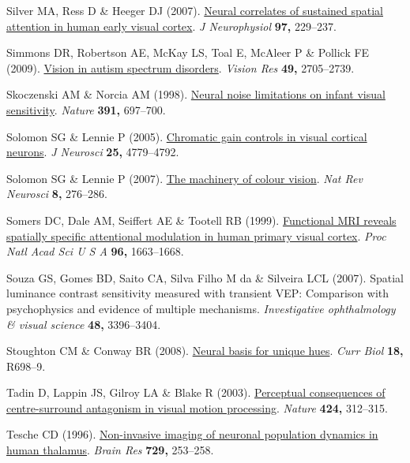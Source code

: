 \documentclass[
  letterpaper,
  DIV=11,
  numbers=noendperiod]{scrartcl}
\newlength{\cslhangindent}
\newenvironment{CSLReferences}[2] %
 {\begin{list}{}{%
  \setlength{\itemindent}{0pt}
  \setlength{\leftmargin}{0pt}
  \setlength{\parsep}{0pt}
  \ifodd #1
   \setlength{\leftmargin}{\cslhangindent}
   \setlength{\itemindent}{-1\cslhangindent}
  \fi
  \setlength{\itemsep}{#2\baselineskip}}}
 {\end{list}}
\begin{document}
\begin{CSLReferences}{1}{1}
Silver MA, Ress D \& Heeger DJ (2007).
\href{https://doi.org/10.1152/jn.00677.2006}{Neural correlates of
sustained spatial attention in human early visual cortex}. \emph{J
Neurophysiol} \textbf{97,} 229--237.

Simmons DR, Robertson AE, McKay LS, Toal E, McAleer P \& Pollick FE
(2009). \href{https://doi.org/10.1016/j.visres.2009.08.005}{Vision in
autism spectrum disorders}. \emph{Vision Res} \textbf{49,} 2705--2739.

Skoczenski AM \& Norcia AM (1998).
\href{https://doi.org/10.1038/35630}{Neural noise limitations on infant
visual sensitivity}. \emph{Nature} \textbf{391,} 697--700.

Solomon SG \& Lennie P (2005).
\href{https://doi.org/10.1523/JNEUROSCI.5316-04.2005}{Chromatic gain
controls in visual cortical neurons}. \emph{J Neurosci} \textbf{25,}
4779--4792.

Solomon SG \& Lennie P (2007).
\href{https://doi.org/10.1038/nrn2094}{The machinery of colour vision}.
\emph{Nat Rev Neurosci} \textbf{8,} 276--286.

Somers DC, Dale AM, Seiffert AE \& Tootell RB (1999).
\href{https://doi.org/10.1073/pnas.96.4.1663}{Functional MRI reveals
spatially specific attentional modulation in human primary visual
cortex}. \emph{Proc Natl Acad Sci U S A} \textbf{96,} 1663--1668.

Souza GS, Gomes BD, Saito CA, Silva Filho M da \& Silveira LCL (2007).
Spatial luminance contrast sensitivity measured with transient {VEP}:
Comparison with psychophysics and evidence of multiple mechanisms.
\emph{Investigative ophthalmology \& visual science} \textbf{48,}
3396--3404.

Stoughton CM \& Conway BR (2008).
\href{https://doi.org/10.1016/j.cub.2008.06.018}{Neural basis for unique
hues}. \emph{Curr Biol} \textbf{18,} R698--9.

Tadin D, Lappin JS, Gilroy LA \& Blake R (2003).
\href{https://doi.org/10.1038/nature01800}{Perceptual consequences of
centre-surround antagonism in visual motion processing}. \emph{Nature}
\textbf{424,} 312--315.

Tesche CD (1996).
\href{https://www.ncbi.nlm.nih.gov/pubmed/8876995}{Non-invasive imaging
of neuronal population dynamics in human thalamus}. \emph{Brain Res}
\textbf{729,} 253--258.


\end{CSLReferences}
\end{document}
